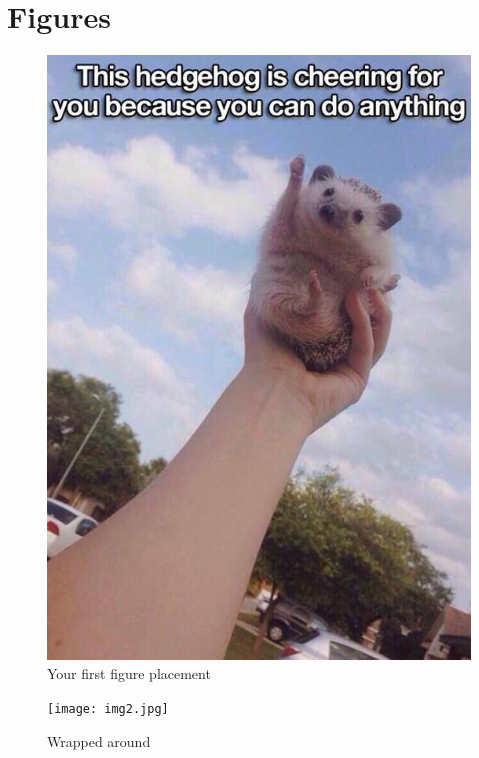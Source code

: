 \section{Figures}

\begin{figure}[H]
\includegraphics[width=\linewidth]{img1.jpg}
\caption{Your first figure placement}
\end{figure}

\blindtext 
\begin{figure}
	\begin{center}
		\texttt{[image: img2.jpg]}
	\end{center}
	\caption{Wrapped around}
\end{figure}
\blindtext 

